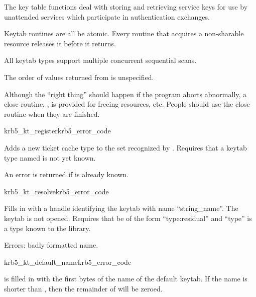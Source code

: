 The key table functions deal with storing and retrieving service keys
for use by unattended services which participate in authentication exchanges.

Keytab routines are all be atomic.  Every routine that acquires
a non-sharable resource releases it before it returns. 

All keytab types support multiple concurrent sequential scans.

The order of values returned from  is
unspecified.

Although the ``right thing'' should happen if the program aborts
abnormally, a close routine, ,  is provided
for freeing resources, etc.  People should use the close routine when
they are finished.

\begin{funcdecl}{krb5_kt_register}{krb5_error_code}{\funcinout}
\funcin
{}
\end{funcdecl}


Adds a new ticket cache type to the set recognized by
.
Requires that a keytab type named  is not
yet known.

An error is returned if  is already known.

\begin{funcdecl}{krb5_kt_resolve}{krb5_error_code}{\funcinout}
\funcin
{}
\funcout
{}
\end{funcdecl}

Fills in  with a handle identifying the keytab with name
``string_name''.  The keytab is not opened.
Requires that  be of the form ``type:residual'' and
``type'' is a type known to the library.

Errors: badly formatted name.
                
\begin{funcdecl}{krb5_kt_default_name}{krb5_error_code}{\funcinout}
\funcin
{}
\end{funcdecl}

 is filled in with the first  bytes of
the name of the default keytab.
If the name is shorter than , then the remainder of
 will be zeroed.


